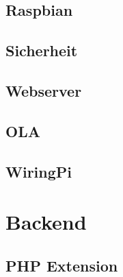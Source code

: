 \documentclass[
    headings=optiontotocandhead,%
    twoside,
    numbers=noenddot,%
    toc=flat, %
    12pt, %
    titlepage, %
    parskip=full, %
    listof=totoc, %
    listof=flat, %
    numbers=noenddot, %
    bibliography=totoc, %
    a4paper,DIV=14,
    BCOR=15mm,
]{scrbook}
\begin{document}
\section{Raspbian}\label{Raspbian}

\renewcommand{\kapitelautor}{Autor: Clemens Scharwitzl}



\section{Sicherheit}\label{Sicherheit}

\renewcommand{\kapitelautor}{Autor: Clemens Scharwitzl}



\section{Webserver}\label{Webserver}

\renewcommand{\kapitelautor}{Autor: Clemens Scharwitzl}



\section{OLA}\label{ola}

\renewcommand{\kapitelautor}{Autor: Clemens Scharwitzl}



\section{WiringPi}\label{WiringPi}

\renewcommand{\kapitelautor}{Autor: Clemens Scharwitzl}



\chapter{Backend}\label{Backend}

\section{PHP Extension}\label{PHP-Extension}
\end{document}
